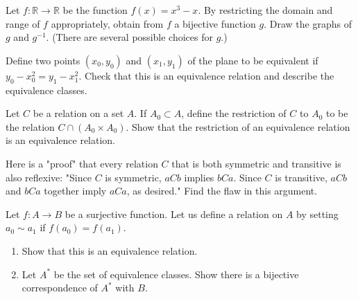   \begin{exercise}[Munkres 2.6]
    Let $f: \mathbb{R} \to \mathbb{R}$ be the function $f(x) = x^3 - x$. By restricting the domain and range of $f$ appropriately, obtain from $f$ a bijective function $g$. Draw the graphs of $g$ and $g^{-1}$. (There are several possible choices for $g$.)
  \end{exercise}
  \begin{solution}
    
  \end{solution}

  \begin{exercise}[Munkres 3.1]
    Define two points $(x_0, y_0)$ and $(x_1, y_1)$ of the plane to be equivalent if $y_0 - x_0^2 = y_1 - x_1^2$. Check that this is an equivalence relation and describe the equivalence classes.
  \end{exercise}
  \begin{solution}
    
  \end{solution}

  \begin{exercise}[Munkres 3.2]
    Let $C$ be a relation on a set $A$. If $A_0 \subset A$, define the restriction of $C$ to $A_0$ to be the relation $C \cap (A_0 \times A_0)$. Show that the restriction of an equivalence relation is an equivalence relation.
  \end{exercise}
  \begin{solution}
    
  \end{solution}

  \begin{exercise}[Munkres 3.3]
    Here is a "proof" that every relation $C$ that is both symmetric and transitive is also reflexive: "Since $C$ is symmetric, $aCb$ implies $bCa$. Since $C$ is transitive, $aCb$ and $bCa$ together imply $aCa$, as desired." Find the flaw in this argument.
  \end{exercise}
  \begin{solution}
    
  \end{solution}

  \begin{exercise}[Munkres 3.4]
    Let $f: A \to B$ be a surjective function. Let us define a relation on $A$ by setting $a_0 \sim a_1$ if $f(a_0) = f(a_1)$.
    \begin{enumerate}
      \item Show that this is an equivalence relation.
      \item Let $A^*$ be the set of equivalence classes. Show there is a bijective correspondence of $A^*$ with $B$.
    \end{enumerate}
  \end{exercise}
  \begin{solution}
    
  \end{solution}

